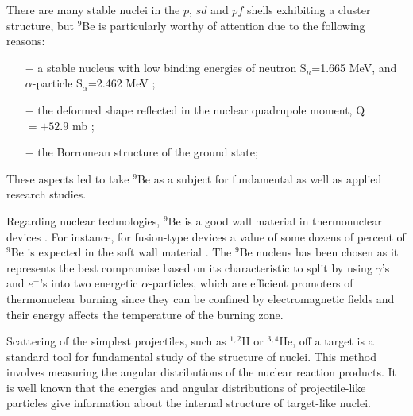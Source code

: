 \documentclass[
11pt, %
english, %
onehalfspacing, %
headsepline, %
]{MastersDoctoralThesis} %
\begin{document}
There are many stable nuclei in the $p$, $sd$ and $pf$ shells exhibiting a cluster structure, but $^9$Be is particularly worthy of attention due to the following reasons: \begin{itemize}
\item[$-$] a stable nucleus with low binding energies of neutron S$_n$=1.665 MeV, and $\alpha$-particle S$_\alpha$=2.462 MeV \cite{separationneutron}; 
\item[$-$] the deformed shape reflected in the nuclear quadrupole moment, Q$=+52.9 $ mb \cite{quadrupole}; 
\item[$-$]  the Borromean structure of the ground state;
\end{itemize}
These aspects led to take $^9$Be as a subject for fundamental  as well as applied research  studies.

Regarding nuclear technologies, $^9$Be is a good wall material in thermonuclear devices \cite{kukulin2010, seksembayev2018}.
For instance, for fusion-type devices a value of some dozens of percent  of $^9$Be is expected in the soft wall material \cite{seksembayev2018}.
The $^9$Be nucleus has been chosen as it represents the best compromise based  on its characteristic to split by using $\gamma$'s and $e^-$'s into two energetic $\alpha$-particles, which are efficient promoters of thermonuclear burning since they can be confined by electromagnetic fields and their energy affects the temperature of the burning zone.

Scattering of the simplest projectiles, such as ${}^{1,2}$H or ${}^{3,4}$He, off a target is a standard tool for fundamental study of the structure of nuclei. This method involves measuring the angular distributions of the nuclear reaction products. It is well known that the energies and angular distributions of projectile-like particles give information about the internal structure of target-like nuclei.
	
\end{document}
